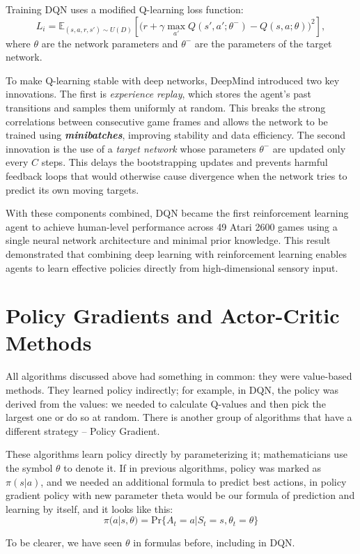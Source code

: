 Training DQN uses a modified Q-learning loss function:
\[
L_i = \mathbb{E}_{(s,a,r,s')\sim U(D)}\left[ \big(r + \gamma \max_{a'} Q(s',a';\theta^{-})
- Q(s,a;\theta) \big)^2 \right],
\]
where $\theta$ are the network parameters and $\theta^{-}$ are the parameters of the
target network.


To make Q-learning stable with deep networks, DeepMind introduced two key innovations.
The first is \textit{experience replay}, which stores the agent’s past transitions and samples
them uniformly at random. This breaks the strong correlations between consecutive game
frames and allows the network to be trained using \textbf{\textit{minibatches}}, improving stability and data
efficiency. The second innovation is the use of a \textit{target network} whose parameters
$\theta^{-}$ are updated only every $C$ steps. This delays the bootstrapping updates and
prevents harmful feedback loops that would otherwise cause divergence when the network
tries to predict its own moving targets.

With these components combined, DQN became the first reinforcement learning agent to
achieve human-level performance across 49 Atari 2600 games using a single neural network
architecture and minimal prior knowledge. This result demonstrated that combining deep
learning with reinforcement learning enables agents to learn effective policies directly from
high-dimensional sensory input.


\section{Policy Gradients and Actor-Critic Methods}
All algorithms discussed above had something in common: they were value-based methods. They learned policy indirectly; for example, in DQN, the policy was derived from the values: we needed to calculate Q-values and then pick the largest one or do so at random. There is another group of algorithms that have a different strategy -- Policy Gradient.


These algorithms learn policy directly by parameterizing it; mathematicians use the symbol $\theta$ to denote it. If in previous algorithms, policy was marked as $\pi(s|a)$, and we needed an additional formula to predict best actions, in policy gradient policy with new parameter theta would be our formula of prediction and learning by itself, and it looks like this:
\[
\pi(a | s, \theta) = \text{Pr}\{A_t = a | S_t = s, \theta_t = \theta\}
\]

To be clearer, we have seen $\theta$ in formulas before, including in DQN. 

